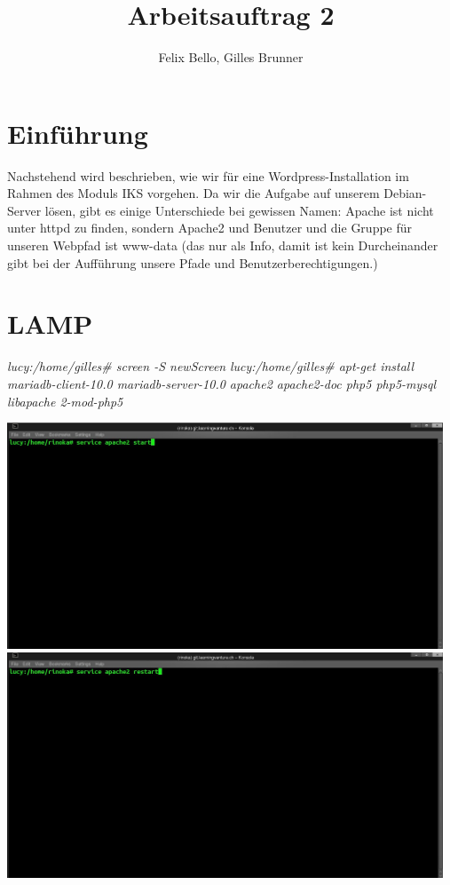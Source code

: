 \documentclass{article}
\author{Felix Bello, Gilles Brunner}
\title{Arbeitsauftrag 2}
\begin{document}
	\maketitle
	\section{Einführung}
Nachstehend wird beschrieben, wie wir für eine Wordpress-Installation im Rahmen des Moduls IKS vorgehen. Da wir die Aufgabe auf unserem Debian-Server lösen, gibt es einige Unterschiede bei gewissen Namen: Apache ist nicht unter httpd zu finden, sondern Apache2 und Benutzer und die Gruppe für unseren Webpfad ist www-data (das nur als Info, damit ist kein Durcheinander gibt bei der Aufführung unsere Pfade und 	Benutzerberechtigungen.)
	\section{LAMP}
	\textit{lucy:/home/gilles\# screen -S newScreen}
	\newline
	\textit{lucy:/home/gilles\# apt-get install mariadb-client-10.0 mariadb-server-10.0 apache2 apache2-doc php5 php5-mysql libapache 2-mod-php5}
	\newline
	
	\includegraphics[width=13cm]{../Pics/start_apache}
	\includegraphics[width=13cm]{../Pics/apach2restart}
\end{document}
